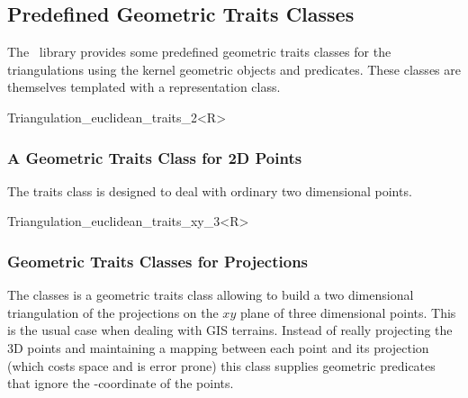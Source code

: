 \subsection{Predefined Geometric Traits Classes}

The \cgal\  library provides some predefined geometric traits classes
for the triangulations using the kernel geometric objects and predicates.
These classes are themselves templated with a representation class.



\begin{ccClassTemplate} {Triangulation_euclidean_traits_2<R>}
\subsubsection{A Geometric Traits Class for 2D Points}
The traits class 
is designed to deal with ordinary  two dimensional points.


\ccTypes
{}

\ccGlue
{}
\ccGlue
{}
\ccGlue
{}
\ccGlue
{}
\ccGlue
{}
\end{ccClassTemplate}


\begin{ccClassTemplate} {Triangulation_euclidean_traits_xy_3<R>}
\subsubsection{Geometric Traits Classes for Projections}
The classes  
is a geometric traits class allowing to
build a two dimensional triangulation of the projections
on the $xy$ plane  of three dimensional points.
This is the usual case when dealing with GIS terrains.
Instead of really projecting the 3D points and
maintaining a mapping between each point and its projection
 (which costs space and is error prone)
this class supplies geometric predicates that ignore the
-coordinate of the points.


\ccTypes

\ccGlue
{}
\ccGlue
{}
\end{ccClassTemplate}

